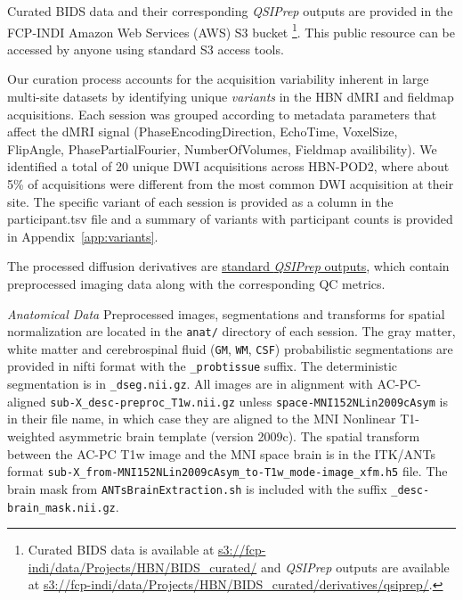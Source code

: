 \documentclass[9pt,lineno]{elife}
\begin{document}
Curated BIDS data and their corresponding \emph{QSIPrep} outputs are provided in the  FCP-INDI Amazon Web Services (AWS) S3 bucket
\footnote{%
    Curated BIDS data is available at 
    \url{s3://fcp-indi/data/Projects/HBN/BIDS_curated/}
    and \emph{QSIPrep} outputs are available at
    \url{s3://fcp-indi/data/Projects/HBN/BIDS_curated/derivatives/qsiprep/}.
}. This public resource can be accessed by anyone using standard S3
access tools.

Our curation process accounts for the acquisition variability inherent in large multi-site datasets
by identifying unique \emph{variants} in the HBN 
dMRI and fieldmap acquisitions. Each session was grouped according to metadata parameters that
affect the dMRI signal (PhaseEncodingDirection, EchoTime, VoxelSize, FlipAngle, PhasePartialFourier,
NumberOfVolumes, Fieldmap availibility). We identified a total of 20 unique DWI acquisitions across
HBN-POD2, where about 5\% of acquisitions were different from the most common DWI acquisition at their
site. The specific variant of each session is provided as a column in the participant.tsv file and a summary of variants with participant counts is provided in Appendix~\ref{app:variants}.

The processed diffusion derivatives are \href{
https://qsiprep.readthedocs.io/en/latest/preprocessing.html#outputs-of-qsiprep}{
standard \emph{QSIPrep} outputs}, which contain preprocessed imaging data
along with the corresponding QC metrics.

\emph{Anatomical Data} Preprocessed images, segmentations and transforms for spatial normalization
are located in the \texttt{anat/} directory of each session. The gray matter, white matter and 
cerebrospinal fluid (\texttt{GM}, \texttt{WM}, \texttt{CSF}) probabilistic
segmentations are provided in nifti format with the \texttt{\_probtissue} suffix. The deterministic 
segmentation is in \texttt{\_dseg.nii.gz}. All images are in alignment with AC-PC-aligned 
\texttt{sub-X\_desc-preproc\_T1w.nii.gz} unless \texttt{space-MNI152NLin2009cAsym} is in their file name,
in which case they are aligned to the MNI Nonlinear T1-weighted asymmetric brain template (version 2009c). 
The spatial transform between the AC-PC T1w image and the MNI space brain is in the ITK/ANTs format 
\texttt{sub-X\_from-MNI152NLin2009cAsym\_to-T1w\_mode-image\_xfm.h5} file. The brain mask from
\texttt{ANTsBrainExtraction.sh} is included with the suffix \texttt{\_desc-brain\_mask.nii.gz}.
\end{document}
